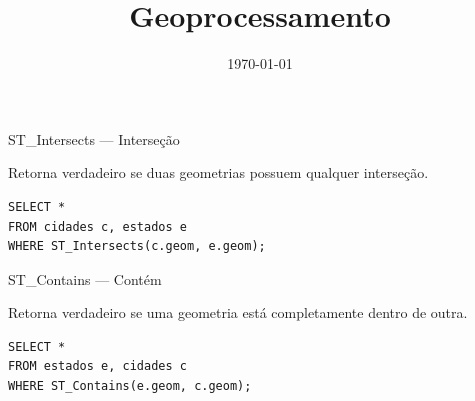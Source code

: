 \documentclass{beamer}
\title{Geoprocessamento}
\date{\today}
\begin{document}
    




\begin{frame}[fragile]{ST\_Intersects — Interseção}
    
    Retorna verdadeiro se duas geometrias possuem qualquer interseção.
    
    \begin{verbatim}
SELECT *
FROM cidades c, estados e
WHERE ST_Intersects(c.geom, e.geom);
    \end{verbatim}
    
    \begin{center}
    \end{center}
    
\end{frame}

\begin{frame}[fragile]{ST\_Contains — Contém}
    
    Retorna verdadeiro se uma geometria está completamente dentro de outra.
    
    \begin{verbatim}
SELECT *
FROM estados e, cidades c
WHERE ST_Contains(e.geom, c.geom);
    \end{verbatim}
    
    \begin{center}
    \end{center}
    
\end{frame}
\end{document}
